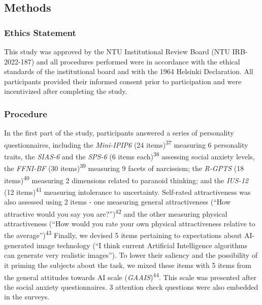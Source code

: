 \documentclass[
  man,floatsintext]{apa6}
\begin{document}
\hypertarget{methods}{%
\subsection{Methods}\label{methods}}

\hypertarget{ethics-statement}{%
\subsubsection{Ethics Statement}\label{ethics-statement}}

This study was approved by the NTU Institutional Review Board (NTU IRB-2022-187) and all procedures performed were in accordance with the ethical standards of the institutional board and with the 1964 Helsinki Declaration. All participants provided their informed consent prior to participation and were incentivized after completing the study.

\hypertarget{procedure}{%
\subsubsection{Procedure}\label{procedure}}

In the first part of the study, participants answered a series of personality questionnaires, including the \emph{Mini-IPIP6}
(24 items)\textsuperscript{37}
measuring 6 personality traits, the \emph{SIAS-6} and the \emph{SPS-6}
(6 items each)\textsuperscript{38}
assessing social anxiety levels, the \emph{FFNI-BF}
(30 items)\textsuperscript{39}
measuring 9 facets of narcissism; the \emph{R-GPTS}
(18 items)\textsuperscript{40}
measuring 2 dimensions related to paranoid thinking; and the \emph{IUS-12}
(12 items)\textsuperscript{41}
measuring intolerance to uncertainty. Self-rated attractiveness was also assessed using 2 items - one measuring general attractiveness
(``How attractive would you say you are?'')\textsuperscript{42}
and the other measuring physical attractiveness
(``How would you rate your own physical attractiveness relative to the average'')\textsuperscript{43}
Finally, we devised 5 items pertaining to expectations about AI-generated image technology (``I think current Artificial Intelligence algorithms can generate very realistic images''). To lower their saliency and the possibility of it priming the subjects about the task, we mixed these items with 5 items from the general attitudes towards AI scale
(\emph{GAAIS})\textsuperscript{44}.
This scale was presented after the social anxiety questionnaires. 3 attention check questions were also embedded in the surveys.
\end{document}
